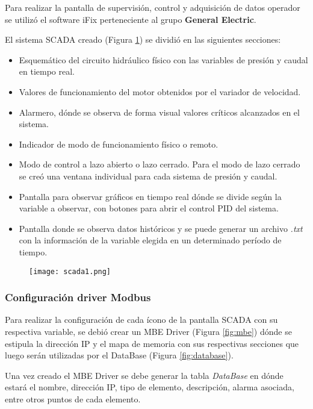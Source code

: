 Para realizar la pantalla de supervisión, control y adquisición de datos operador se utilizó el software iFix perteneciente al grupo \textbf{General Electric}.

El sistema SCADA creado (Figura \ref{fig:scada1}) se dividió en las siguientes secciones:
\begin{itemize}
	\item Esquemático del circuito hidráulico físico con las variables de presión y caudal en tiempo real.
	\item Valores de funcionamiento del motor obtenidos por el variador de velocidad.
	\item Alarmero, dónde se observa de forma visual valores críticos alcanzados en el sistema.
	\item Indicador de modo de funcionamiento físico o remoto.
	\item Modo de control a lazo abierto o lazo cerrado.
	\subitem Para el modo de lazo cerrado se creó una ventana individual para cada sistema de presión y caudal.
	\item Pantalla para observar gráficos en tiempo real dónde se divide según la variable a observar, con botones para abrir el control PID del sistema.
	\item Pantalla donde se observa datos históricos y se puede generar un archivo \textit{.txt} con la información de la variable elegida en un determinado período de tiempo.
\end{itemize} 

\begin{figure}[htb]
	\centering
	\texttt{[image: scada1.png]}
	\label{fig:scada1}
\end{figure}


\subsubsection{Configuración driver Modbus}
Para realizar la configuración de cada ícono de la pantalla SCADA con su respectiva variable, se debió crear un MBE Driver (Figura \ref{fig:mbe}) dónde se estipula la dirección IP y el mapa de memoria con sus respectivas secciones que luego serán utilizadas por el DataBase (Figura \ref{fig:database}). 

Una vez creado el MBE Driver se debe generar la tabla \textit{DataBase} en dónde estará el nombre, dirección IP, tipo de elemento, descripción, alarma asociada, entre otros puntos de cada elemento.

